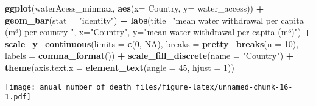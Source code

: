 \documentclass[
]{article}
\newenvironment{Shaded}{\begin{snugshade}}{\end{snugshade}}
\newcommand{\AttributeTok}[1]{\textcolor[rgb]{0.13,0.29,0.53}{#1}}
\newcommand{\ConstantTok}[1]{\textcolor[rgb]{0.56,0.35,0.01}{#1}}
\newcommand{\DecValTok}[1]{\textcolor[rgb]{0.00,0.00,0.81}{#1}}
\newcommand{\FunctionTok}[1]{\textcolor[rgb]{0.13,0.29,0.53}{\textbf{#1}}}
\newcommand{\NormalTok}[1]{#1}
\newcommand{\SpecialCharTok}[1]{\textcolor[rgb]{0.81,0.36,0.00}{\textbf{#1}}}
\newcommand{\StringTok}[1]{\textcolor[rgb]{0.31,0.60,0.02}{#1}}
\begin{document}
\begin{Shaded}
\begin{Highlighting}[]
\FunctionTok{ggplot}\NormalTok{(waterAcess\_minmax, }\FunctionTok{aes}\NormalTok{(}\AttributeTok{x=}\NormalTok{ Country, }\AttributeTok{y=} \StringTok{\textasciigrave{}}\AttributeTok{water\_access}\StringTok{\textasciigrave{}}\NormalTok{)) }\SpecialCharTok{+} \FunctionTok{geom\_bar}\NormalTok{(}\AttributeTok{stat =} \StringTok{"identity"}\NormalTok{) }\SpecialCharTok{+} \FunctionTok{labs}\NormalTok{(}\AttributeTok{title=}\StringTok{"mean water withdrawal per capita (m³) per country "}\NormalTok{, }\AttributeTok{x=}\StringTok{"Country"}\NormalTok{, }\AttributeTok{y=}\StringTok{"mean water withdrawal per capita (m³)"}\NormalTok{) }\SpecialCharTok{+} \FunctionTok{scale\_y\_continuous}\NormalTok{(}\AttributeTok{limits =} \FunctionTok{c}\NormalTok{(}\DecValTok{0}\NormalTok{, }\ConstantTok{NA}\NormalTok{), }\AttributeTok{breaks =} \FunctionTok{pretty\_breaks}\NormalTok{(}\AttributeTok{n =} \DecValTok{10}\NormalTok{), }\AttributeTok{labels =} \FunctionTok{comma\_format}\NormalTok{()) }\SpecialCharTok{+} \FunctionTok{scale\_fill\_discrete}\NormalTok{(}\AttributeTok{name =} \StringTok{"Country"}\NormalTok{) }\SpecialCharTok{+} 
  \FunctionTok{theme}\NormalTok{(}\AttributeTok{axis.text.x =} \FunctionTok{element\_text}\NormalTok{(}\AttributeTok{angle =} \DecValTok{45}\NormalTok{, }\AttributeTok{hjust =} \DecValTok{1}\NormalTok{)) }
\end{Highlighting}
\end{Shaded}

\texttt{[image: anual\_number\_of\_death\_files/figure-latex/unnamed-chunk-16-1.pdf]}
\end{document}

